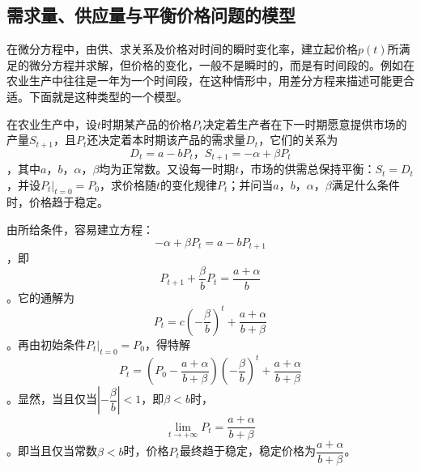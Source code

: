 		\subsection{需求量、供应量与平衡价格问题的模型}

		在微分方程中，由供、求关系及价格对时间的瞬时变化率，建立起价格$p(t)$所满足的微分方程并求解，但价格的变化，一般不是瞬时的，而是有时间段的。例如在农业生产中往往是一年为一个时间段，在这种情形中，用差分方程来描述可能更合适。下面就是这种类型的一个模型。

		\example 在农业生产中，设$t$时期某产品的价格$P_t$决定着生产者在下一时期愿意提供市场的产量$S_{t+1}$，且$P_{t}$还决定着本时期该产品的需求量$D_t$，它们的关系为$$D_t = a - bP_t \text{，} S_{t+1} = -\alpha + \beta P_t$$，其中$a$，$b$，$\alpha$，$\beta$均为正常数。又设每一时期$t$，市场的供需总保持平衡：$S_t = D_t$，并设$P_t | _{t=0} = P_0$，求价格随$t$的变化规律$P_t$；并问当$a$，$b$，$\alpha$，$\beta$满足什么条件时，价格趋于稳定。

		\answer 由所给条件，容易建立方程：$$-\alpha + \beta P_t = a - bP_{t+1}$$，即$$P_{t+1} + \frac{\beta}{b}P_t = \frac{a + \alpha}{b}$$。它的通解为$$P_t = c\left(-\frac{\beta}{b}\right) ^t + \frac{a + \alpha}{b + \beta}$$。再由初始条件$P_t | _{t=0} = P_0$，得特解$$P_t = \left(P_0 - \frac{a + \alpha}{b + \beta}\right)\left(-\frac{\beta}{b}\right)^t + \frac{a + \alpha}{b + \beta}$$。显然，当且仅当$|-\dfrac{\beta}{b}| < 1$，即$\beta < b$时，$$\lim _{t \to +\infty}P_t = \frac{a + \alpha}{b + \beta}$$。即当且仅当常数$\beta < b$时，价格$P_t$最终趋于稳定，稳定价格为$\dfrac{a + \alpha}{b + \beta}$。
